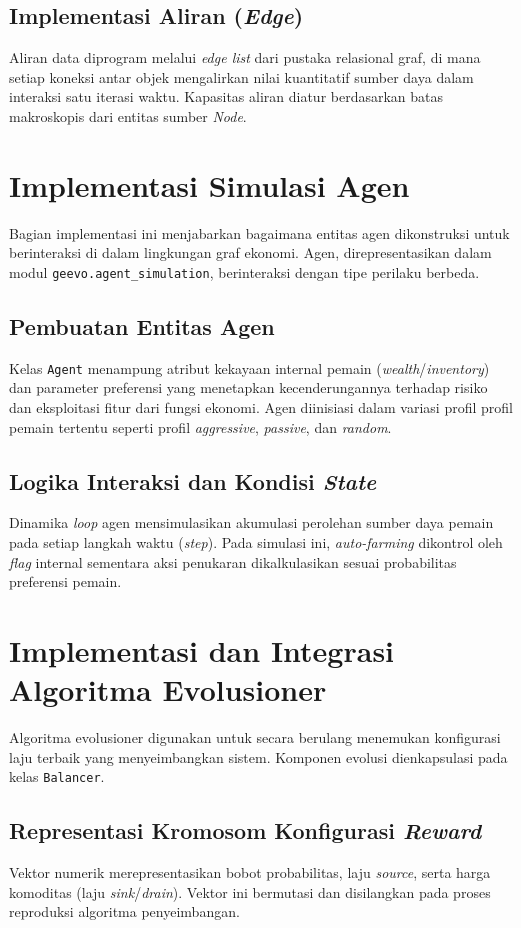 \subsection{Implementasi Aliran (\textit{Edge})}
Aliran data diprogram melalui \textit{edge list} dari pustaka relasional graf, di mana setiap koneksi antar objek mengalirkan nilai kuantitatif sumber daya dalam interaksi satu iterasi waktu. Kapasitas aliran diatur berdasarkan batas makroskopis dari entitas sumber \textit{Node}.

\section{Implementasi Simulasi Agen}
Bagian implementasi ini menjabarkan bagaimana entitas agen dikonstruksi untuk berinteraksi di dalam lingkungan graf ekonomi. Agen, direpresentasikan dalam modul \texttt{geevo.agent\_simulation}, berinteraksi dengan tipe perilaku berbeda.

\subsection{Pembuatan Entitas Agen}
Kelas \texttt{Agent} menampung atribut kekayaan internal pemain (\textit{wealth}/\textit{inventory}) dan parameter preferensi yang menetapkan kecenderungannya terhadap risiko dan eksploitasi fitur dari fungsi ekonomi. Agen diinisiasi dalam variasi profil profil pemain tertentu seperti profil \textit{aggressive}, \textit{passive}, dan \textit{random}.

\subsection{Logika Interaksi dan Kondisi \textit{State}}
Dinamika \textit{loop} agen mensimulasikan akumulasi perolehan sumber daya pemain pada setiap langkah waktu (\textit{step}). Pada simulasi ini, \textit{auto-farming} dikontrol oleh \textit{flag} internal sementara aksi penukaran dikalkulasikan sesuai probabilitas preferensi pemain.

\section{Implementasi dan Integrasi Algoritma Evolusioner}
Algoritma evolusioner digunakan untuk secara berulang menemukan konfigurasi laju terbaik yang menyeimbangkan sistem. Komponen evolusi dienkapsulasi pada kelas \texttt{Balancer}.

\subsection{Representasi Kromosom Konfigurasi \textit{Reward}}
Vektor numerik merepresentasikan bobot probabilitas, laju \textit{source}, serta harga komoditas (laju \textit{sink}/\textit{drain}). Vektor ini bermutasi dan disilangkan pada proses reproduksi algoritma penyeimbangan.

